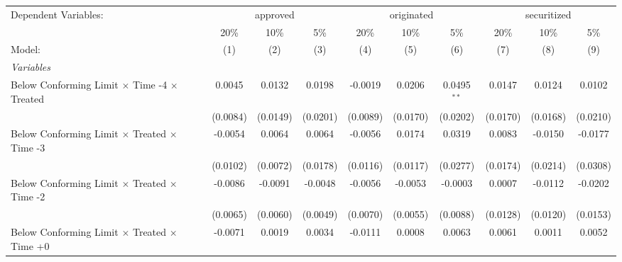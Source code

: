 \begingroup
\centering
\begin{tabular}{lccccccccc}
   \tabularnewline \midrule \midrule
   Dependent Variables: & \multicolumn{3}{c}{approved} & \multicolumn{3}{c}{originated} & \multicolumn{3}{c}{securitized}\\
                                                              & 20\%           & 10\%           & 5\%            & 20\%          & 10\%           & 5\%           & 20\%          & 10\%          & 5\% \\    
   Model:                                                     & (1)            & (2)            & (3)            & (4)           & (5)            & (6)           & (7)           & (8)           & (9)\\  
   \midrule
   \emph{Variables}\\
   Below Conforming Limit $\times$ Time -4 $\times$ Treated   & 0.0045         & 0.0132         & 0.0198         & -0.0019       & 0.0206         & 0.0495$^{**}$ & 0.0147        & 0.0124        & 0.0102\\   
                                                              & (0.0084)       & (0.0149)       & (0.0201)       & (0.0089)      & (0.0170)       & (0.0202)      & (0.0170)      & (0.0168)      & (0.0210)\\   
   Below Conforming Limit $\times$ Treated $\times$ Time -3   & -0.0054        & 0.0064         & 0.0064         & -0.0056       & 0.0174         & 0.0319        & 0.0083        & -0.0150       & -0.0177\\   
                                                              & (0.0102)       & (0.0072)       & (0.0178)       & (0.0116)      & (0.0117)       & (0.0277)      & (0.0174)      & (0.0214)      & (0.0308)\\   
   Below Conforming Limit $\times$ Treated $\times$ Time -2   & -0.0086        & -0.0091        & -0.0048        & -0.0056       & -0.0053        & -0.0003       & 0.0007        & -0.0112       & -0.0202\\   
                                                              & (0.0065)       & (0.0060)       & (0.0049)       & (0.0070)      & (0.0055)       & (0.0088)      & (0.0128)      & (0.0120)      & (0.0153)\\   
   Below Conforming Limit $\times$ Treated $\times$ Time +0   & -0.0071        & 0.0019         & 0.0034         & -0.0111       & 0.0008         & 0.0063        & 0.0061        & 0.0011        & 0.0052\\   

\end{tabular}
